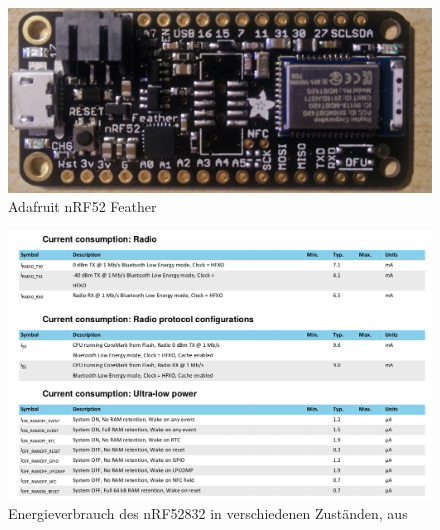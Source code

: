 \begin{figure}[h]
  \centering
	\includegraphics[width=\textwidth]{images/nrf52layout.jpg}
  \caption{Adafruit nRF52 Feather}
  \label{fig:nrf52layout}
\end{figure}

\begin{figure}[h]
  \centering
	\includegraphics[width=\textwidth]{images/nrf52consumption.png}
  \caption{Energieverbrauch des nRF52832 in verschiedenen Zuständen, aus \cite{nordic2017nrf}}
  \label{fig:nrf52consumption}
\end{figure}


